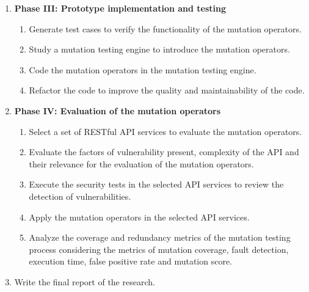 \begin{enumerate}
  \item{ \textbf{Phase III: Prototype implementation and testing}

    \begin{enumerate}
    \item Generate test cases to verify the functionality of the mutation operators.
    \item Study a mutation testing engine to introduce the mutation operators.
    \item Code the mutation operators in the mutation testing engine.
    \item Refactor the code to improve the quality and maintainability of the code.
  \end{enumerate}}

\item{ \textbf{Phase IV: Evaluation of the mutation operators}

  \begin{enumerate}
    \item Select a set of RESTful API services to evaluate the mutation operators.
    \item Evaluate the factors of vulnerability present, complexity of the API and their relevance for the evaluation of the mutation operators.
    \item Execute the security tests in the selected API services to review the detection of vulnerabilities.
    \item Apply the mutation operators in the selected API services.
    \item Analyze the coverage and redundancy metrics of the mutation testing process considering the metrics of mutation coverage, fault detection, execution time, false positive rate and mutation score.
  \end{enumerate}}
  \item {Write the final report of the research.}
\end{enumerate}

